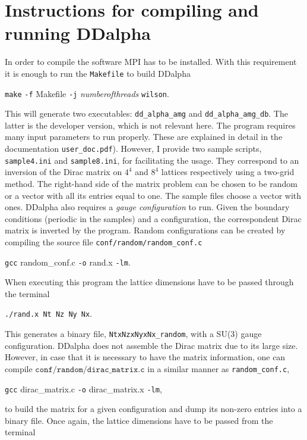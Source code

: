 \documentclass[a4paper,12pt]{scrartcl}
\begin{document}
\section{Instructions for compiling and running DDalpha}
In order to compile the software MPI has to be installed. With this requirement it is enough to run the \texttt{Makefile} to build DDalpha   \begin{center}
\texttt{make} \texttt{-f} Makefile \texttt{-j} \textit{numberofthreads} \texttt{wilson}.
\end{center}This will generate two executables: \texttt{dd\_alpha\_amg} and \texttt{dd\_alpha\_amg\_db}. The latter is the developer version, which is not relevant here. The program requires many input parameters to run properly. These are explained in detail in the documentation \texttt{user\_doc.pdf}). However, I provide two sample scripts, \texttt{sample4.ini} and \texttt{sample8.ini}, for facilitating the usage. They correspond to an inversion of the Dirac matrix on $4^4$ and $8^4$ lattices respectively using a two-grid method. The right-hand side of the matrix problem can be chosen to be random or a vector with all its entries equal to one. The sample files choose a vector with ones. DDalpha also requires a \textit{gauge configuration} to run. Given the boundary conditions (periodic in the samples) and a configuration, the correspondent Dirac matrix  is inverted by the program. Random configurations can be created by compiling the source file \texttt{conf/random/random\_conf.c} \begin{center}
\texttt{gcc} random\_conf.c \texttt{-o} rand.x \texttt{-lm}.
\end{center}When executing this program the lattice dimensions have to be passed through the terminal\begin{center}
 \texttt{./rand.x Nt Nz Ny Nx}.
\end{center}This generates a binary file, \texttt{NtxNzxNyxNx\_random}, with a SU(3) gauge configuration. DDalpha does not assemble the Dirac matrix due to its large size. However, in case that it is necessary to have the matrix information, one can compile $\texttt{conf/random/dirac\_matrix.c}$ in a similar manner as \texttt{random\_conf.c},\begin{center}
\texttt{gcc} dirac\_matrix.c \texttt{-o} dirac\_matrix.x \texttt{-lm},
\end{center}to build the matrix for a given configuration and dump its non-zero entries into a binary file. Once again, the lattice dimensions have to be passed from the terminal \begin{center}

\end{center}
\end{document}
